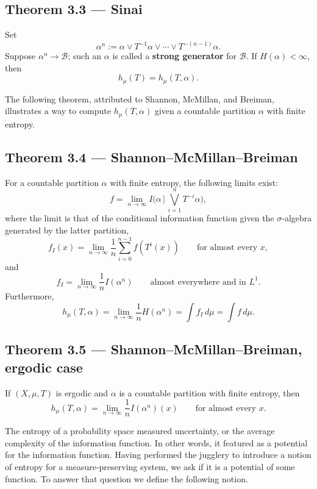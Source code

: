 \documentclass[11pt,a4paper]{article}
\begin{document}
\subsection*{Theorem 3.3 --- Sinai}
Set
\[
\alpha^n:=\alpha\vee T^{-1}\alpha\vee\cdots\vee T^{-(n-1)}\alpha.
\]
Suppose $\alpha^n\to\mathcal B$; such an $\alpha$ is called a \textbf{strong generator} for $\mathcal B$. If $H(\alpha)<\infty$, then
\[
h_\mu(T)=h_\mu(T,\alpha).
\]

The following theorem, attributed to Shannon, McMillan, and Breiman, illustrates a way to compute $h_\mu(T,\alpha)$ given a countable partition $\alpha$ with finite entropy.

\subsection*{Theorem 3.4 --- Shannon--McMillan--Breiman}
For a countable partition $\alpha$ with finite entropy, the following limits exist:
\[
f=\lim_{n\to\infty}I\Bigg(\alpha\,\Bigg|\,\bigvee_{i=1}^{n}T^{-i}\alpha\Bigg),
\]
where the limit is that of the conditional information function given the $\sigma$-algebra generated by the latter partition,
\[
f_I(x)=\lim_{n\to\infty}\frac1n\sum_{i=0}^{n-1}f(T^i(x))
\qquad\text{for almost every }x,
\]
and
\[
f_I=\lim_{n\to\infty}\frac1n I(\alpha^n)
\qquad\text{almost everywhere and in }L^1.
\]
Furthermore,
\[
h_\mu(T,\alpha)=\lim_{n\to\infty}\frac1nH(\alpha^n)
=\int f_I\,d\mu=\int f\,d\mu.
\]

\subsection*{Theorem 3.5 --- Shannon--McMillan--Breiman, ergodic case}
If $(X,\mu,T)$ is ergodic and $\alpha$ is a countable partition with finite entropy, then
\[
h_\mu(T,\alpha)=\lim_{n\to\infty}\frac1n I(\alpha^n)(x)
\qquad\text{for almost every }x.
\]



The entropy of a probability space measured uncertainty, or the average
complexity of the information function. In other words, it featured as a
potential for the information function. Having performed the jugglery to
introduce a notion of entropy for a measure-preserving system, we ask if it is
a potential of some function. To answer that question we define the following
notion.
\end{document}
